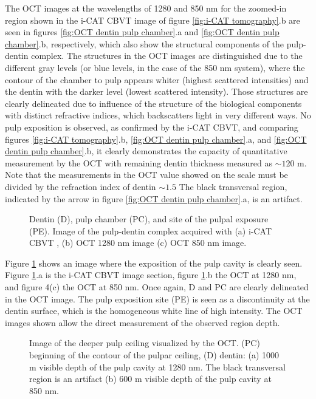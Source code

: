 \documentclass[12pt,twoside,english]{book}
\renewcommand{\~}{\perispomeni}%
\DeclareRobustCommand{\textgreek}[1]{\leavevmode{\greektext #1}}
\numberwithin{equation}{section}
\numberwithin{figure}{section}
\begin{document}
The OCT images at the wavelengths of 1280 and 850 nm for the zoomed-in region shown in the i-CAT CBVT image of figure \ref{fig:i-CAT tomography}.b are seen in figures \ref{fig:OCT dentin pulp chamber}.a and \ref{fig:OCT dentin pulp chamber}.b, respectively, which also show the structural components of the pulp-dentin complex. The structures in the OCT images are distinguished due to the different gray levels (or blue levels, in the case of the 850 nm system), where the contour of the chamber to pulp appears whiter (highest scattered intensities) and the dentin with the darker level (lowest scattered intensity). Those structures are clearly delineated due to influence of the structure of the biological components with distinct refractive indices, which backscatters light in very different ways. No pulp exposition is observed, as confirmed by the i-CAT CBVT, and comparing figures \ref{fig:i-CAT tomography}.b, \ref{fig:OCT dentin pulp chamber}.a, and \ref{fig:OCT dentin pulp chamber}.b, it clearly demonstrates the capacity of quantitative measurement by the OCT with remaining dentin thickness measured as $\sim120$ \textgreek{m}m. Note that the measurements in the OCT value showed on the scale must be divided by the refraction index of dentin $\sim1.5$\cite{Colston:1998p1677} The black transversal region, indicated by the arrow in figure \ref{fig:OCT dentin pulp chamber}.a, is an artifact.
\begin{figure}[h]
\centering{}
\caption{Dentin (D), pulp chamber (PC), and site of the pulpal exposure (PE). Image of the pulp-dentin complex acquired with (a) i-CAT CBVT , (b) OCT 1280 nm image (c) OCT 850 nm image.\label{fig:pulp exposure}}
\end{figure}

Figure \ref{fig:pulp exposure} shows an image where the exposition of the pulp cavity is clearly seen. Figure \ref{fig:pulp exposure}.a is the i-CAT CBVT image section, figure \ref{fig:pulp exposure}.b the OCT at 1280 nm, and figure 4(c) the OCT at 850 nm. Once again, D and PC are clearly delineated in the OCT image. The pulp exposition site (PE) is seen as a discontinuity at the dentin surface, which is the homogeneous white line of high intensity. The OCT images shown allow the direct measurement of the observed region depth.
\begin{figure}[h]
\centering{}
\caption{Image of the deeper pulp ceiling visualized by the OCT. (PC) beginning of the contour of the pulpar ceiling, (D) dentin: (a) 1000 \textgreek{m}m visible depth of the pulp cavity at 1280 nm. The black transversal region is an artifact (b) 600 \textgreek{m}m visible depth of the pulp cavity at 850 nm.\label{fig:deep ceiling}}
\end{figure}
\end{document}
